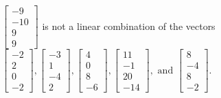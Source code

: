 \begin{exercise}
\begin{exerciseStatement}
  \end{exerciseStatement}
  \begin{exerciseAnswer}
   \(\left[\begin{array}{c}
-9 \\
-10 \\
9 \\
9
\end{array}\right]\) 
  	 is not  
	a linear combination of the vectors \(\left[\begin{array}{c}
-2 \\
2 \\
0 \\
-2
\end{array}\right] , \left[\begin{array}{c}
-3 \\
1 \\
-4 \\
2
\end{array}\right] , \left[\begin{array}{c}
4 \\
0 \\
8 \\
-6
\end{array}\right] , \left[\begin{array}{c}
11 \\
-1 \\
20 \\
-14
\end{array}\right] , \text{ and } \left[\begin{array}{c}
8 \\
-4 \\
8 \\
-2
\end{array}\right]\).

	
  


  \end{exerciseAnswer}
\end{exercise}
